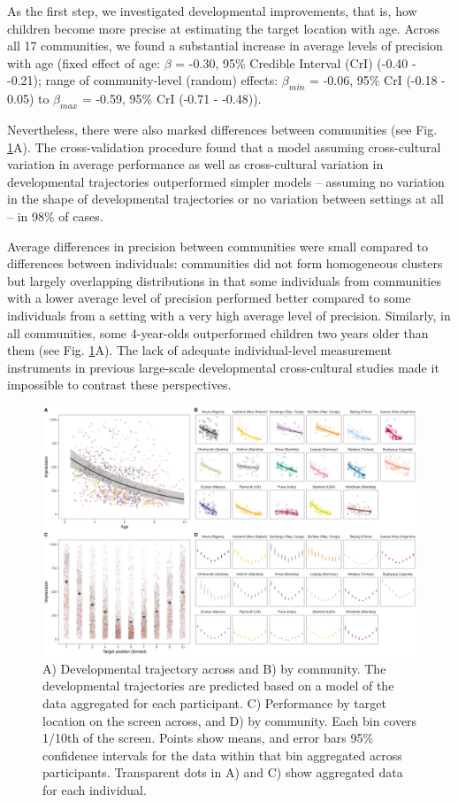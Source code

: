 \documentclass[
  man,floatsintext]{apa6}
\begin{document}
As the first step, we investigated developmental improvements, that is, how children become more precise at estimating the target location with age. Across all 17 communities, we found a substantial increase in average levels of precision with age (fixed effect of age: \(\beta\) = -0.30, 95\% Credible Interval (CrI) (-0.40 - -0.21); range of community-level (random) effects: \(\beta_{min}\) = -0.06, 95\% CrI (-0.18 - 0.05) to \(\beta_{max}\) = -0.59, 95\% CrI (-0.71 - -0.48)).

Nevertheless, there were also marked differences between communities (see Fig. \ref{fig:fig2}A). The cross-validation procedure found that a model assuming cross-cultural variation in average performance as well as cross-cultural variation in developmental trajectories outperformed simpler models -- assuming no variation in the shape of developmental trajectories or no variation between settings at all -- in 98\% of cases.

Average differences in precision between communities were small compared to differences between individuals: communities did not form homogeneous clusters but largely overlapping distributions in that some individuals from communities with a lower average level of precision performed better compared to some individuals from a setting with a very high average level of precision. Similarly, in all communities, some 4-year-olds outperformed children two years older than them (see Fig. \ref{fig:fig2}A). The lack of adequate individual-level measurement instruments in previous large-scale developmental cross-cultural studies made it impossible to contrast these perspectives.

\begin{figure}

{\centering \includegraphics[width=1\linewidth]{../figures/pvis_pred} 

}

\caption{A) Developmental trajectory across and B) by community. The developmental trajectories are predicted based on a model of the data aggregated for each participant. C) Performance by target location on the screen across, and D) by community. Each bin covers 1/10th of the screen. Points show means, and error bars 95\% confidence intervals for the data within that bin aggregated across participants. Transparent dots in A) and C) show aggregated data for each individual.}\label{fig:fig2}
\end{figure}
\end{document}
